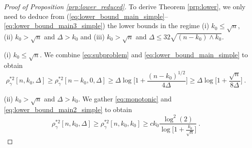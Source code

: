 \documentclass[twoside,11pt]{article}
\newcommand{\<}{\langle}
\renewcommand{\>}{\rangle}
\begin{document}
 \begin{proof}[Proof of Proposition \ref{prp:lower_reduced}]
 To derive Theorem \ref{prp:lower}, we only need to deduce from (\ref{eq:lower_bound_main_simple}--\ref{eq:lower_bound_main3_simple})  the lower bounds in the regime  (i) $k_0\leq \sqrt{n}$, (ii) $k_0> \sqrt{n}$ and $\Delta>k_0$ and (iii) $k_0>\sqrt{n}$ and $\Delta\leq 32\sqrt{(n-k_0)\wedge  k_0}$.
 
 
 \medskip 
 
 \noindent
(i) $k_0\leq \sqrt{n}$. We combine \eqref{eq:subproblem} and \eqref{eq:lower_bound_main_simple} to obtain
\[
 \rho_{\gamma}^{*2}[n,k_0,\Delta]\geq \rho_{\gamma}^{*2}[n-k_0,0,\Delta] \geq \Delta \log\Big[1+ \frac{ (n-k_0)^{1/2}}{4\Delta} \Big]\geq \Delta \log\Big[1+ \frac{ \sqrt{n}}{8\Delta} \Big]\ .
\]


 \medskip 

 \noindent
(ii) $k_0> \sqrt{n}$ and $\Delta>k_0$. We gather \eqref{eq:monotonic} and \eqref{eq:lower_bound_main2_simple} to obtain
\[
 \rho_{\gamma}^{*2}[n,k_0,\Delta]\geq \rho_{\gamma}^{*2}[n,k_0,k_0]\geq c k_0 \frac{\log^2(2)}{\log\big[1+ \frac{k_0}{\sqrt{n}}\big]}\ .
\]

 \medskip 


\end{proof}
\end{document}
